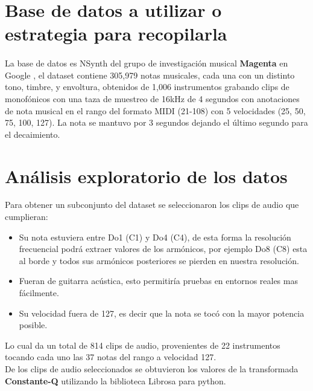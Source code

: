 \documentclass[12pt]{article}
\begin{document}
	\section{Base de datos a utilizar o estrategia para recopilarla}
	\paragraph{} La base de datos es NSynth del grupo de investigación musical \textbf{Magenta} en Google \cite{engel_neural_2017}, el dataset contiene 305,979 notas musicales, cada una con un distinto tono, timbre, y envoltura, obtenidos de 1,006 instrumentos grabando clips de monofónicos con una taza de muestreo de 16kHz de 4 segundos con anotaciones de nota musical en el rango del formato MIDI (21-108) con 5 velocidades (25, 50, 75, 100, 127). La nota se mantuvo por 3 segundos dejando el último segundo para el decaimiento.
	\pagebreak
	\section{Análisis exploratorio de los datos}
	Para obtener un subconjunto del dataset se seleccionaron los clips de audio que cumplieran:
	\begin{itemize}
		\item  Su nota estuviera entre Do1 (C1) y Do4 (C4), de esta forma la resolución frecuencial podrá extraer valores de los armónicos, por ejemplo Do8 (C8) esta al borde y todos sus armónicos posteriores se pierden en nuestra resolución.
		\item Fueran de guitarra acústica, esto permitiría pruebas en entornos reales mas fácilmente.
		\item Su velocidad fuera de 127, es decir que la nota se tocó con la mayor potencia posible.
	\end{itemize}
	Lo cual da un total de 814 clips de audio, provenientes de 22 instrumentos tocando cada uno las 37 notas del rango a velocidad 127.\\
	
	De los clips de audio seleccionados se obtuvieron los valores de la transformada \textbf{Constante-Q} utilizando la biblioteca Librosa\cite{mcfee_librosa_2015} para python.
	
\end{document}
